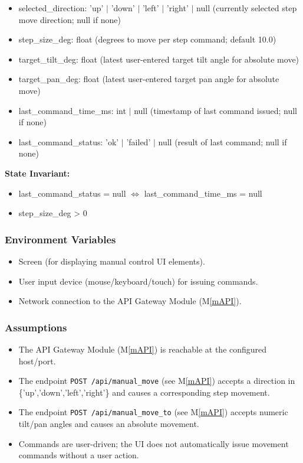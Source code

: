 \documentclass[12pt, titlepage]{article}
\newcommand{\mref}[1]{M\ref{#1}}
\begin{document}
\begin{itemize}
  \item selected\_direction: 'up' $|$ 'down' $|$ 'left' $|$ 'right' $|$ null (currently
        selected step move direction; null if none)
  \item step\_size\_deg: float (degrees to move per step command; default 10.0)
  \item target\_tilt\_deg: float (latest user-entered target tilt angle for absolute
        move)
  \item target\_pan\_deg: float (latest user-entered target pan angle for absolute
        move)
  \item last\_command\_time\_ms: int $|$ null (timestamp of last command issued; null
        if none)
  \item last\_command\_status: 'ok' $|$ 'failed' $|$ null (result of last command; null
        if none)
\end{itemize}

\noindent \textbf{State Invariant:}
\begin{itemize}
  \item last\_command\_status = null $\Leftrightarrow$ last\_command\_time\_ms = null
  \item step\_size\_deg > 0
\end{itemize}

\subsubsection{Environment Variables}

\begin{itemize}
  \item Screen (for displaying manual control UI elements).
  \item User input device (mouse/keyboard/touch) for issuing commands.
  \item Network connection to the API Gateway Module (\mref{mAPI}).
\end{itemize}

\subsubsection{Assumptions}

\begin{itemize}
  \item The API Gateway Module (\mref{mAPI}) is reachable at the configured host/port.
  \item The endpoint \texttt{POST /api/manual\_move} (see \mref{mAPI}) accepts a
        direction in \{'up','down','left','right'\} and causes a corresponding step
        movement.
  \item The endpoint \texttt{POST /api/manual\_move\_to} (see \mref{mAPI}) accepts
        numeric tilt/pan angles and causes an absolute movement.
  \item Commands are user-driven; the UI does not automatically issue movement commands
        without a user action.
\end{itemize}
\end{document}
